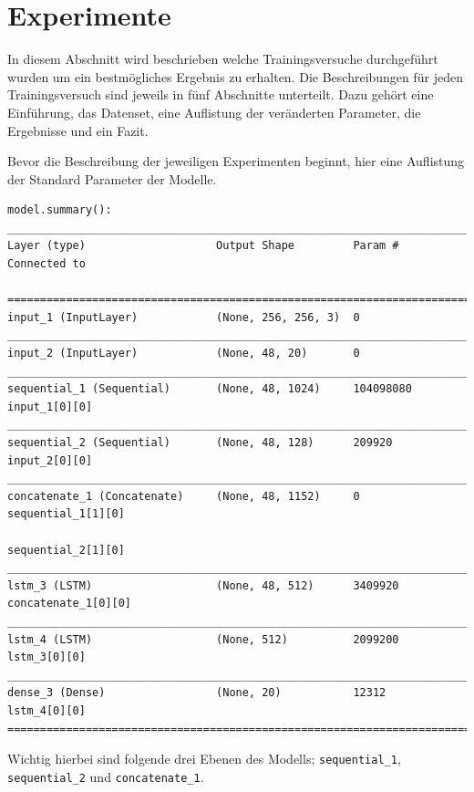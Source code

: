 \documentclass[pdftex,a4paper,halfparskip, article]{scrartcl}
\begin{document}
\section{Experimente}

In diesem Abschnitt wird beschrieben welche Trainingsversuche durchgeführt wurden um ein bestmögliches Ergebnis zu erhalten. Die Beschreibungen für jeden Trainingsversuch sind jeweils in fünf Abschnitte unterteilt. Dazu gehört eine Einführung, das Datenset, eine Auflistung der veränderten Parameter, die Ergebnisse und ein Fazit.

Bevor die Beschreibung der jeweiligen Experimenten beginnt, hier eine Auflistung der Standard Parameter der Modelle. 

\begin{verbatim}
model.summary():
________________________________________________________________________________
Layer (type)                    Output Shape         Param #     Connected to

================================================================================
input_1 (InputLayer)            (None, 256, 256, 3)  0
________________________________________________________________________________
input_2 (InputLayer)            (None, 48, 20)       0
________________________________________________________________________________
sequential_1 (Sequential)       (None, 48, 1024)     104098080   input_1[0][0]
________________________________________________________________________________
sequential_2 (Sequential)       (None, 48, 128)      209920      input_2[0][0]
________________________________________________________________________________
concatenate_1 (Concatenate)     (None, 48, 1152)     0           sequential_1[1][0]
                                                                 sequential_2[1][0]
________________________________________________________________________________
lstm_3 (LSTM)                   (None, 48, 512)      3409920     concatenate_1[0][0]
________________________________________________________________________________
lstm_4 (LSTM)                   (None, 512)          2099200     lstm_3[0][0]
________________________________________________________________________________
dense_3 (Dense)                 (None, 20)           12312       lstm_4[0][0]
================================================================================
\end{verbatim}

Wichtig hierbei sind folgende drei Ebenen des Modells; \texttt{sequential\_1}, \texttt{sequential\_2} und \texttt{concatenate\_1}. 
\end{document}

